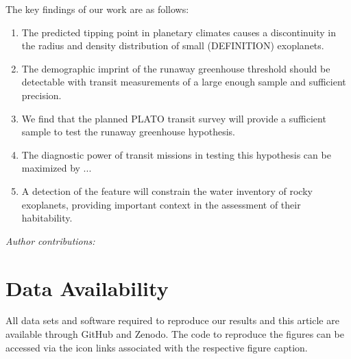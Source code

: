 \documentclass[modern]{aastex631}
\begin{document}
The key findings of our work are as follows:
\begin{enumerate}
    \item The predicted tipping point in planetary climates causes a discontinuity in the radius and density distribution of small (DEFINITION) exoplanets.
    \item The demographic imprint of the runaway greenhouse threshold should be detectable with transit measurements of a large enough sample and sufficient precision.
    \item We find that the planned PLATO transit survey will provide a sufficient sample to test the runaway greenhouse hypothesis.
    \item The diagnostic power of transit missions in testing this hypothesis can be maximized by ...
    \item A detection of the feature will constrain the water inventory of rocky exoplanets, providing important context in the assessment of their habitability.
\end{enumerate}




\begin{large}\textit{Author contributions:}\end{large}

\section*{Data Availability}
All data sets and software required to reproduce our results and this article are available through GitHub and Zenodo.
The code to reproduce the figures can be accessed via the icon links associated with the respective figure caption.






\end{document}
